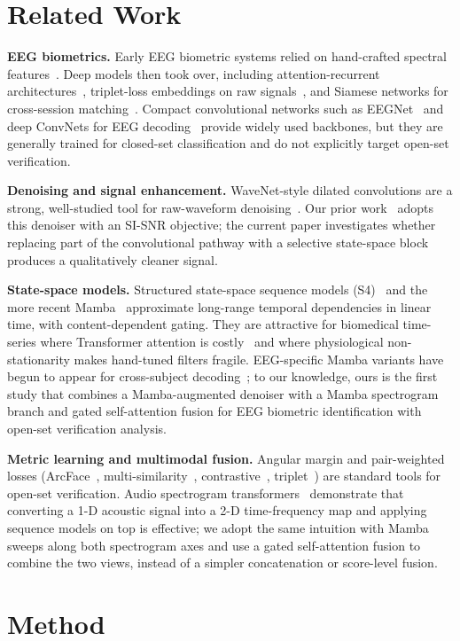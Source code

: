 \documentclass{IEEEtran}
\begin{document}
\section{Related Work}
\textbf{EEG biometrics.}
Early EEG biometric systems relied on hand-crafted spectral
features~\cite{b12}. Deep models then took over, including
attention-recurrent architectures~\cite{b14}, triplet-loss embeddings on
raw signals~\cite{b13}, and Siamese networks for cross-session
matching~\cite{b12}. Compact convolutional networks such as
EEGNet~\cite{b17} and deep ConvNets for EEG decoding~\cite{b19} provide
widely used backbones, but they are generally trained for closed-set
classification and do not explicitly target open-set verification.

\textbf{Denoising and signal enhancement.}
WaveNet-style dilated convolutions are a strong, well-studied tool for
raw-waveform denoising~\cite{b2,b10}. Our prior work~\cite{b1} adopts this
denoiser with an SI-SNR objective; the current paper investigates whether
replacing part of the convolutional pathway with a selective state-space
block produces a qualitatively cleaner signal.

\textbf{State-space models.}
Structured state-space sequence models (S4)~\cite{b4} and the more recent
Mamba~\cite{b3} approximate long-range temporal dependencies in linear
time, with content-dependent gating. They are attractive for biomedical
time-series where Transformer attention is costly~\cite{b15} and where
physiological non-stationarity makes hand-tuned filters fragile.
EEG-specific Mamba variants have begun to appear for cross-subject
decoding~\cite{b18}; to our knowledge, ours is the first study that
combines a Mamba-augmented denoiser with a Mamba spectrogram branch and
gated self-attention fusion for EEG biometric identification with open-set
verification analysis.

\textbf{Metric learning and multimodal fusion.}
Angular margin and pair-weighted losses (ArcFace~\cite{b6},
multi-similarity~\cite{b7}, contrastive~\cite{b9}, triplet~\cite{b8}) are
standard tools for open-set verification. Audio spectrogram
transformers~\cite{b16} demonstrate that converting a 1-D acoustic signal
into a 2-D time-frequency map and applying sequence models on top is
effective; we adopt the same intuition with Mamba sweeps along both
spectrogram axes and use a gated self-attention fusion to combine the two
views, instead of a simpler concatenation or score-level fusion.

\section{Method}
\end{document}
